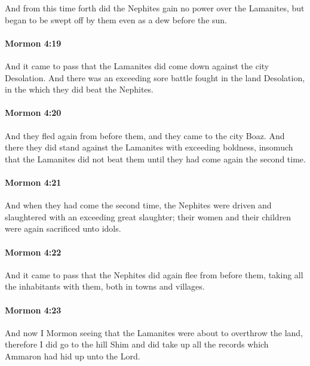 			And from this time forth did the Nephites gain no power over the Lamanites,
			but began to be swept off by them even as a dew before the sun.

		\paragraph{Mormon 4:19} %
			\label{MORMON-4-19}

			And it came to pass that the Lamanites did come down against the city Desolation.
			And there was an exceeding sore battle fought in the land Desolation,
			in the which they did beat the Nephites.

		\paragraph{Mormon 4:20} %
			\label{MORMON-4-20}

			And they fled again from before them,
			and they came to the city Boaz.
			And there they did stand against the Lamanites with exceeding boldness,
			insomuch that the Lamanites did not beat them
			until they had come again the second time.

		\paragraph{Mormon 4:21} %
			\label{MORMON-4-21}

			And when they had come the second time,
			the Nephites were driven and slaughtered with an exceeding great slaughter;
			their women and their children were again sacrificed unto idols.

		\paragraph{Mormon 4:22} %
			\label{MORMON-4-22}

			And it came to pass that the Nephites did again flee from before them,
			taking all the inhabitants with them, both in towns and villages.

		\paragraph{Mormon 4:23} %
			\label{MORMON-4-23}

			And now I Mormon
			seeing that the Lamanites were about to overthrow the land,
			therefore I did go to the hill Shim
			and did take up all the records which Ammaron had hid up unto the Lord.

